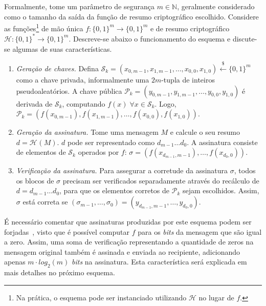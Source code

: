 \documentclass[12pt,notitlepage]{report}
\newcommand{\hh}{\mathcal{H}}
\newcommand{\pk}{\mathcal{P}_k}
\newcommand{\sk}{\mathcal{S}_k}
\newcommand{\hash}[2][]{\mathcal{H}^{#1}(#2)}
\newcommand{\binwds}[1]{\{0, 1\}^{#1}}
\newcommand{\fhash}[1]{\hh{} : \binwds{*} \longrightarrow \binwds{#1}}
\begin{document}
Formalmente, tome um parâmetro de segurança $m \in \mathbb{N}$, geralmente considerado como o
tamanho da saída da função de resumo criptográfico escolhido. Considere as
funções\footnote{Na prática, o esquema pode ser instanciado utilizando $\hh{}$
no lugar de $f$.} de mão única $f : \binwds{m} \longrightarrow \binwds{m}$ e de
resumo criptográfico $\fhash{m}$.  Descreve-se abaixo o funcionamento do
esquema e discute-se algumas de suas características.

\begin{enumerate}

  \item[] \emph{Geração de chaves.} Defina $\sk{} = (x_{0, m-1}, x_{1, m-1},
      \dots, x_{0,0}, x_{1,0}) \stackrel{\$}{\longleftarrow} \binwds{m}$ como a
        chave privada, informalmente uma $2m$-tupla de inteiros
        pseudoaleatórios. A chave pública $\pk{} = (y_{0, m-1}, y_{1, m-1},
        \dots, y_{0,0}, y_{1,0})$ é derivada de $\sk{}$, computando $f(x) \;
        \forall x \in  \sk{}$. Logo, $\pk{} = (f(x_{0, m-1}), f(x_{1, m-1}),
        \dots, f(x_{0,0}), f(x_{1,0}))$.

  \item[] \emph{Geração da assinatura.} Tome uma mensagem $M$ e calcule o seu
      resumo $d = \hash{M}$. $d$ pode ser representado como $d_{m-1} \dots
        d_0$. A assinatura consiste de elementos de $\sk{}$ operados por $f$:
        $\sigma = (f(x_{d_{m-1}, m-1}), \dots, f(x_{d_0, 0}))$.

  \item[] \emph{Verificação da assinatura.} Para assegurar a corretude da
      assinatura $\sigma$, todos os blocos de $\sigma$ precisam ser verificados
        separadamente através do recálculo de $d = d_{m-1} \dots d_0$, para que
        os elementos corretos de $\pk{}$ sejam escolhidos.  Assim, $\sigma$
        está correta se $(\sigma_{m-1}, \dots, \sigma_0) = (y_{d_{m-1}, m-1},
        \dots, y_{d_{0}, 0})$.

\end{enumerate}

É necessário comentar que assinaturas produzidas por este esquema podem ser
forjadas~\cite{Merkle:1989:CDS:118209.118230}, visto que é possível computar
$f$ para os \emph{bits} da mensagem que são igual a zero. Assim, uma soma de
verificação representando a quantidade de zeros na mensagem original também é
assinada e enviada ao recipiente, adicionando apenas $m \cdot log_2(m)$
\emph{bits} na assinatura. Esta característica será explicada em mais detalhes
no próximo esquema.
\end{document}
